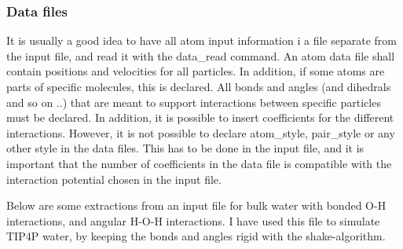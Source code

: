 \subsubsection{Data files}
It is usually a good idea to have all atom input information i a file separate from the input file, and read it with the data\_read command. An atom data file shall contain positions and velocities for all particles. In addition, if some atoms are parts of specific molecules, this is declared. All bonds and angles (and dihedrals and so on ..) that are meant to support interactions between specific particles must be declared. In addition, it is possible to insert coefficients for the different interactions. However, it is not possible to declare atom\_style, pair\_style or any other style in the data files. This has to be done in the input file, and it is important that the number of coefficients in the data file is compatible with the interaction potential chosen in the input file. 

Below are some extractions from an input file for bulk water with bonded O-H interactions, and angular H-O-H interactions. I have used this file to simulate TIP4P water, by keeping the bonds and angles rigid with the shake-algorithm. 

